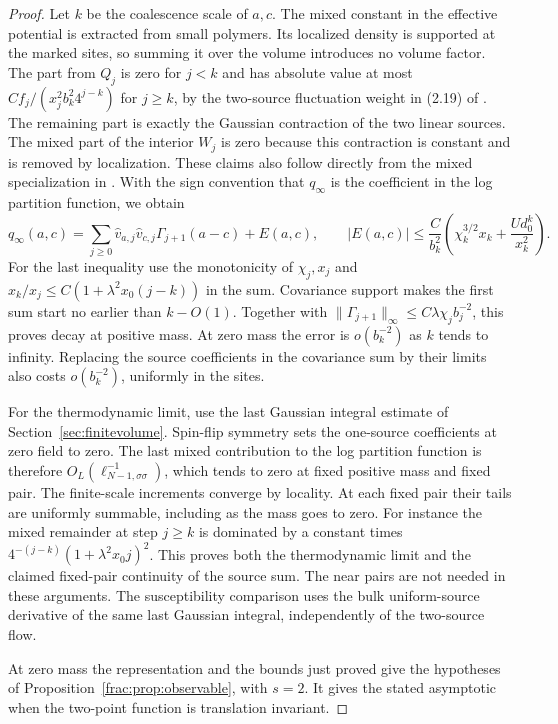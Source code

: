 \documentclass[11pt]{article}
\begin{document}
\begin{proof}
Let \(k\) be the coalescence scale of \(a,c\). The mixed constant
in the effective potential is extracted from small polymers. Its
localized density is supported at the marked sites, so summing it
over the volume introduces no volume factor.
The part from \(Q_j\) is zero for \(j<k\) and has absolute
value at most \(Cf_j/(x_j^2b_k^2 4^{j-k})\) for
\(j\ge k\), by the two-source fluctuation weight in (2.19) of
\cite{ParkMap}. The remaining part is exactly the Gaussian
contraction of the two linear sources. The mixed part of the
interior \(W_j\) is zero because this contraction is constant
and is removed by localization. These claims also follow
directly from the mixed specialization in \cite[Lemma~8.4]{ParkTorus}.
With the sign convention that \(q_\infty\) is the coefficient
in the log partition function, we obtain
\[
 q_\infty(a,c)=\sum_{j\ge0}\widehat v_{a,j}
            \widehat v_{c,j}\Gamma_{j+1}(a-c)+E(a,c),
 \qquad
 |E(a,c)|\le \frac{C}{b_k^2}
 \left(\chi_k^{3/2}x_k+\frac{Ud_0^k}{x_k^2}\right).
\]
For the last inequality use the monotonicity of \(\chi_j,x_j\)
and \(x_k/x_j\le C(1+\lambda^2x_0(j-k))\) in the sum. Covariance
support makes the first sum start no earlier than \(k-O(1)\).
Together with \(\|\Gamma_{j+1}\|_\infty\le C\lambda\chi_j b_j^{-2}\),
this proves decay at positive mass. At zero mass the error is
\(o(b_k^{-2})\) as \(k\) tends to infinity. Replacing the source
coefficients in the covariance sum by their limits also costs
\(o(b_k^{-2})\), uniformly in the sites.

For the thermodynamic limit, use the last Gaussian integral
estimate of Section~\ref{sec:finitevolume}. Spin-flip symmetry
sets the one-source coefficients at zero field to zero.
The last mixed contribution to the log partition function is
therefore \(O_L(\ell_{N-1,\sigma\sigma}^{-1})\), which tends to
zero at fixed positive mass and fixed pair.
The finite-scale increments converge by locality. At each
fixed pair their tails are uniformly summable, including
as the mass goes to zero. For instance the mixed remainder
at step \(j\ge k\) is dominated by a constant times
\(4^{-(j-k)}(1+\lambda^2x_0j)^2\). This proves
both the thermodynamic limit and the claimed fixed-pair
continuity of the source sum. The near pairs are not needed
in these arguments. The susceptibility comparison uses the
bulk uniform-source derivative of the same last Gaussian
integral, independently of the two-source flow.

At zero mass the representation and the bounds just proved
give the hypotheses of Proposition~\ref{frac:prop:observable},
with \(s=2\).
It gives the stated asymptotic when the two-point function is
translation invariant.
\end{proof}
\end{document}

